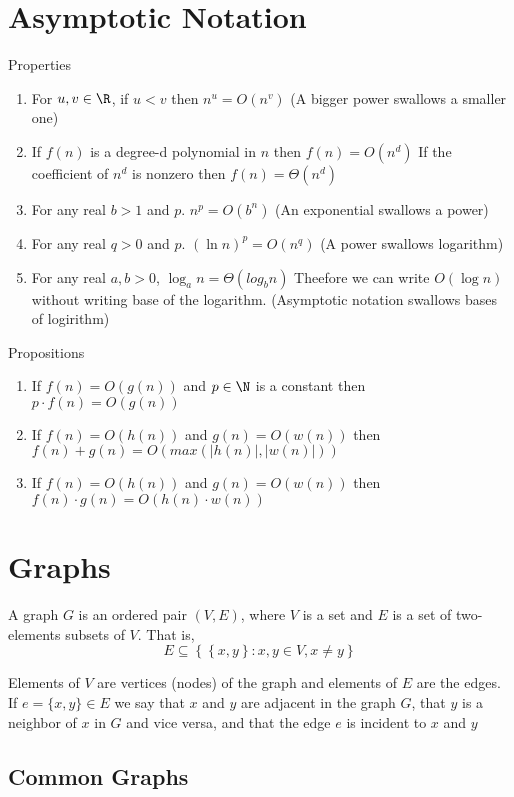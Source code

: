 \documentclass[11pt]{article}
\begin{document}
\section*{Asymptotic Notation}

Properties
\begin{enumerate}
  \item For $u,v\in\R$, if $u<v$ then $n^u = O(n^v)$ (A bigger power swallows a smaller one)
  \item If $f(n)$ is a degree-d polynomial in $n$ then $f(n)=O(n^d)$ If the coefficient of $n^d$ is nonzero then $f(n) = \Theta (n^d)$
  \item For any real $b>1$ and $p$. $n^p = O(b^n)$ (An exponential swallows a power)
  \item For any real $q>0$ and $p$. $(\ln n)^p = O(n^q)$ (A power swallows logarithm)
  \item For any real $a,b>0$, $\log_a n = \Theta(log_b n)$ Theefore we can write $O(\log n)$ without writing base of the logarithm. (Asymptotic notation swallows bases of logirithm)
\end{enumerate}

$ $\\
Propositions
\begin{enumerate}
  \item If $f(n) = O(g(n))$ and $p\in\N$ is a constant then $p\cdot f(n) = O(g(n))$
  \item If $f(n) = O(h(n))$ and $g(n) = O(w(n))$ then $f(n) + g(n) = O(max(| h(n) |, | w(n) |))$
  \item If $f(n) = O(h(n))$ and $g(n) = O(w(n))$ then $f(n)\cdot g(n) = O(h(n)\cdot w(n))$
\end{enumerate}


\section*{Graphs}

A graph $G$ is an ordered pair $(V,E)$, where $V$ is a set and $E$ is a set of two-elements subsets of $V$. That is,
\[
  E \subseteq \left\{ \left\{ x, y \right\}: x,y\in V, x\neq y\right\}
\]

Elements of $V$ are vertices (nodes) of the graph and elements of $E$ are the edges. If $e = \{ x,y \} \in E$ we say that $x$ and $y$ are adjacent in the graph $G$, that $y$ is a neighbor of $x$ in $G$ and vice versa, and that the edge $e$ is incident to $x$ and $y$

\subsection*{Common Graphs}
\end{document}
